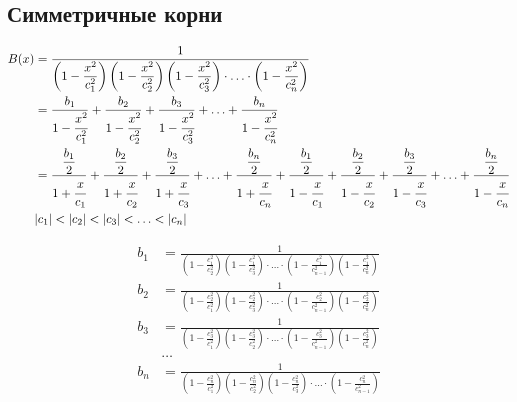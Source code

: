 
\subsection{Симметричные корни}

\begin{equation*} \begin{aligned}
B(x) &= \frac{1}{
\left(1 - \displaystyle \frac{x^2}{c_1^2} \right)
\left(1 - \displaystyle \frac{x^2}{c_2^2} \right)
\left(1 - \displaystyle \frac{x^2}{c_3^2} \right) \cdot
\ldots \cdot
\left(1 - \displaystyle \frac{x^2}{c_n^2} \right)
} \\ &
= \frac{b_1}{1 - \cfrac{x^2}{c_1^2}}
+ \frac{b_2}{1 - \cfrac{x^2}{c_2^2}}
+ \frac{b_3}{1 - \cfrac{x^2}{c_3^2}}
+ \ldots
+ \frac{b_n}{1 - \cfrac{x^2}{c_n^2}} \\ &
= \frac{\displaystyle \frac{b_1}{2}}{1 + \cfrac{x}{c_1}}
+ \frac{\displaystyle \frac{b_2}{2}}{1 + \cfrac{x}{c_2}}
+ \frac{\displaystyle \frac{b_3}{2}}{1 + \cfrac{x}{c_3}}
+ \ldots
+ \frac{\displaystyle \frac{b_n}{2}}{1 + \cfrac{x}{c_n}}
+ \frac{\displaystyle \frac{b_1}{2}}{1 - \cfrac{x}{c_1}}
+ \frac{\displaystyle \frac{b_2}{2}}{1 - \cfrac{x}{c_2}}
+ \frac{\displaystyle \frac{b_3}{2}}{1 - \cfrac{x}{c_3}}
+ \ldots
+ \frac{\displaystyle \frac{b_n}{2}}{1 - \cfrac{x}{c_n}} \\
&|c_1| < |c_2| < |c_3| < \ldots < |c_n|
\end{aligned} \end{equation*}

\begin{equation*} \begin{aligned}
b_1 &= \frac{1}{
\left(1 - \displaystyle \frac{c_1^2}{c_2^2} \right)
\left(1 - \displaystyle \frac{c_1^2}{c_3^2} \right) \cdot
\ldots \cdot
\left(1 - \displaystyle \frac{c_1^2}{c_{n - 1}^2} \right)
\left(1 - \displaystyle \frac{c_1^2}{c_n^2} \right)} \\
b_2 &= \frac{1}{
\left(1 - \displaystyle \frac{c_2^2}{c_1^2} \right)
\left(1 - \displaystyle \frac{c_2^2}{c_3^2} \right) \cdot
\ldots \cdot
\left(1 - \displaystyle \frac{c_2^2}{c_{n - 1}^2} \right)
\left(1 - \displaystyle \frac{c_2^2}{c_n^2} \right)} \\
b_3 &= \frac{1}{
\left(1 - \displaystyle \frac{c_3^2}{c_1^2} \right)
\left(1 - \displaystyle \frac{c_3^2}{c_2^2} \right) \cdot
\ldots \cdot
\left(1 - \displaystyle \frac{c_3^2}{c_{n - 1}^2} \right)
\left(1 - \displaystyle \frac{c_3^2}{c_n^2} \right)} \\
&\ldots \\
b_n &= \frac{1}{
\left(1 - \displaystyle \frac{c_n^2}{c_1^2} \right)
\left(1 - \displaystyle \frac{c_n^2}{c_2^2} \right)
\left(1 - \displaystyle \frac{c_n^2}{c_3^2} \right) \cdot
\ldots \cdot
\left(1 - \displaystyle \frac{c_n^2}{c_{n - 1}^2} \right)} \\
\end{aligned} \end{equation*}

